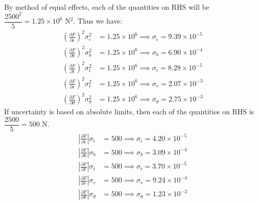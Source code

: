 \documentclass[a4paper, 11pt]{article}
\let\e\epsilon
\begin{document}
\begin{enumerate}[label=(\arabic*),leftmargin=*]
\begin{align*}
\end{align*}
By method of equal effects, each of the quantities on RHS will be $\dfrac{2500^2}{5}=1.25\times 10^6$ N$^2$. Thus we have:
\begin{align*}
	\left(\frac{\partial F}{\partial \e}\right)^2\sigma_{\e}^2&=1.25\times 10^6\implies \boxed{\sigma_{\e}=9.39\times 10^{-5}}\\
	\left(\frac{\partial F}{\partial b}\right)^2\sigma_{b}^2&=1.25\times 10^6\implies \boxed{\sigma_{b}=6.90\times 10^{-4}}\\
	\left(\frac{\partial F}{\partial t}\right)^2\sigma_{t}^2&=1.25\times 10^6\implies \boxed{\sigma_{t}=8.28\times 10^{-5}}\\
	\left(\frac{\partial F}{\partial r}\right)^2\sigma_{r}^2&=1.25\times 10^6\implies \boxed{\sigma_{r}=2.07\times 10^{-3}}\\
	\left(\frac{\partial F}{\partial \theta}\right)^2\sigma_{\theta}^2&=1.25\times 10^6\implies \boxed{\sigma_{\theta}=2.75\times 10^{-3}}
\end{align*}
If uncertainty is based on absolute limits, then each of the quantities on RHS is $\dfrac{2500}{5}=500$ N.
\begin{align*}
	\left|\frac{\partial F}{\partial \e}\right|\sigma_{\e}&=500\implies \boxed{\sigma_{\e}=4.20\times 10^{-5}}\\
	\left|\frac{\partial F}{\partial b}\right|\sigma_{b}&=500\implies \boxed{\sigma_{b}=3.09\times 10^{-4}}\\
	\left|\frac{\partial F}{\partial t}\right|\sigma_{t}&=500\implies \boxed{\sigma_{t}=3.70\times 10^{-5}}\\
	\left|\frac{\partial F}{\partial r}\right|\sigma_{r}&=500\implies \boxed{\sigma_{r}=9.24\times 10^{-4}}\\
	\left|\frac{\partial F}{\partial \theta}\right|\sigma_{\theta}&=500\implies \boxed{\sigma_{\theta}=1.23\times 10^{-3}}
\end{align*}
\end{enumerate}
\end{document}
